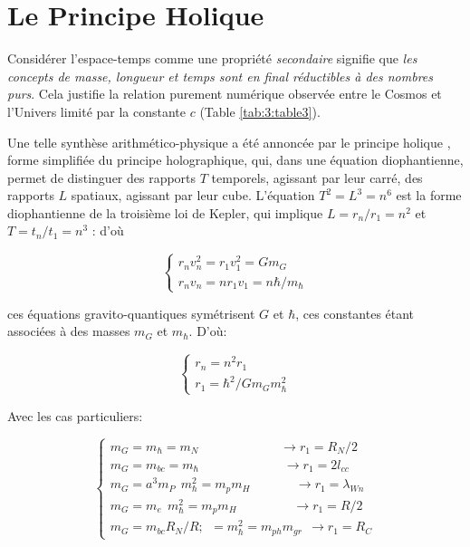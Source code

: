 \documentclass[a4paper,9pt]{article}
\newcounter{row}
\begin{document}
\section{Le Principe Holique}
Considérer l'espace-temps comme une propriété \textit{secondaire} signifie que \textit{les concepts de masse, longueur et temps sont en final réductibles à des nombres purs}. Cela justifie la relation purement numérique observée entre le Cosmos et l'Univers limité par la constante $c$ (Table \ref{tab:3:table3}).


Une telle synthèse arithmético-physique a été annoncée par le principe holique \cite{Sanchez1}, forme simplifiée du principe holographique, qui, dans une équation diophantienne, permet de distinguer des rapports $T$ temporels, agissant par leur carré, des rapports $L$ spatiaux, agissant par leur cube. L'équation $T^2 = L^3 = n^6$ est la forme diophantienne de la troisième loi de Kepler, qui implique $L = r_n/r_1 = n^2$ et $T = t_n/t_1 = n^3$ : d'où 

 \begin{equation}
 \left\{
    \begin{array}{ll}
        r_nv_n^2 = r_1v_1^2 = Gm_G \\
        r_nv_n = nr_1v_1 = n \hbar/m_{\hbar}
    \end{array}
\right.
\end{equation}

ces équations gravito-quantiques symétrisent $G$ et $\hbar$, ces constantes étant associées à des masses $m_G$ et $m_{\hbar}$. D'où:

\begin{equation}
 \left\{
    \begin{array}{ll}
        r_n = n^2 r_1 \\
        r_1 = \hbar^2/Gm_Gm_{\hbar}^2   
    \end{array}
\right.
\end{equation}

Avec les cas particuliers:

\begin{equation}
 \left\{
    \begin{array}{ll}
        m_G = m_{\hbar} = m_N  ~~~~~~~~~~~~~~~~~~~~~~~~~~~~~ \rightarrow r_1 = R_N/2 \\
        
        
        m_G = m_{bc} = m_{\hbar}   ~~~~~~~~~~~~~~~~~~~~~~~~~~~~~~ \rightarrow r_1 = 2l_{cc} \\
        
        m_G = a^3 m_P~~ m_{\hbar}^2 = m_pm_H ~~~~~~~~~~~~~~~~ \rightarrow r_1 = \lambda_{Wn} \\
        m_G = m_e~~ m_{\hbar}^2 = m_pm_H ~~~~~~~~~~~~~~~~~~~~ \rightarrow r_1 = R/2 \\
         
         m_G = m_{bc}R_N/R;~~ = m_{\hbar}^2 = m_{ph}m_{gr}    ~~ \rightarrow r_1 = R_C 
    \end{array}
\right.
\end{equation}
\end{document}

